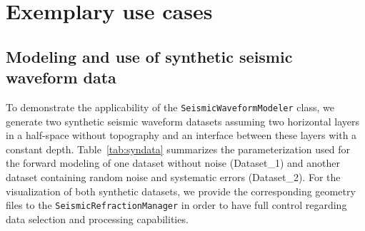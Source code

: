 \documentclass[a4paper,fleqn]{cas-sc}
\begin{document}
\section{Exemplary use cases}

\subsection{Modeling and use of synthetic seismic waveform data}

To demonstrate the applicability of the \texttt{SeismicWaveformModeler} class, we generate two synthetic seismic waveform datasets assuming two horizontal layers in a half-space without topography and an interface between these layers with a constant depth.
Table~\ref{tab:syndata} summarizes the parameterization used for the forward modeling of one dataset without noise (Dataset\_1) and another dataset containing random noise and systematic errors (Dataset\_2).
For the visualization of both synthetic datasets, we provide the corresponding geometry files to the \texttt{SeismicRefractionManager} in order to have full control regarding data selection and processing capabilities. 
\end{document}
